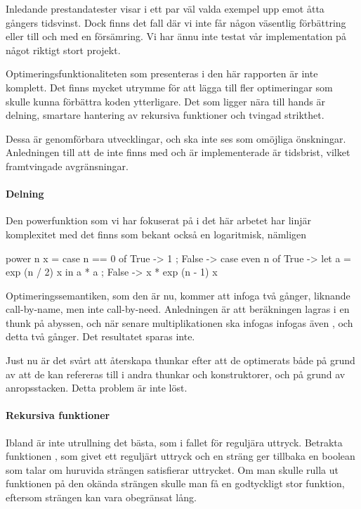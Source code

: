 \documentclass[Rapport]{subfiles}
\begin{document}
Inledande prestandatester visar i ett par väl valda exempel upp emot åtta gångers
tidsvinst. Dock finns det fall där vi inte får någon väsentlig förbättring eller
till och med en försämring. Vi har ännu inte testat vår implementation på något riktigt stort
projekt. 

Optimeringsfunktionaliteten som presenteras i den här rapporten är inte
komplett. Det finns mycket utrymme för att lägga till fler optimeringar
som skulle kunna förbättra koden ytterligare. Det som ligger nära till hands är
delning, smartare hantering av rekursiva funktioner och tvingad strikthet.

Dessa är genomförbara utvecklingar, och ska inte ses som omöjliga önskningar.
Anledningen till att de inte finns med och är implementerade är tidsbrist, vilket
framtvingade avgränsningar.

\paragraph{Delning}
Den powerfunktion som vi har fokuserat på i det här arbetet har linjär
komplexitet med det finns som bekant också en logaritmisk, nämligen

\begin{codeEx}
power n x = case n == 0 of
    { True  -> 1
    ; False -> case even n of
        { True  -> let a = exp (n / 2) x 
                   in  a * a
        ; False -> x * exp (n - 1) x
        }
    }
\end{codeEx}

Optimeringssemantiken, som den är nu, kommer att infoga  två gånger,
liknande call-by-name, men inte call-by-need. Anledningen är att beräkningen
 lagras i en thunk på abyssen, och när senare multiplikationen ska
infogas infogas även , och detta två gånger. Det resultatet sparas
inte.

    Just nu är det svårt att återskapa thunkar efter att de optimerats både på grund
av att de kan refereras till i andra thunkar och konstruktorer, och på grund
av anropsstacken. Detta problem är inte löst.

\paragraph{Rekursiva funktioner}
\label{sec:future-regexp}
Ibland är inte utrullning det bästa, som i fallet för reguljära uttryck.
Betrakta funktionen , som givet
ett reguljärt uttryck och en sträng ger tillbaka en boolean som talar om huruvida strängen
satisfierar uttrycket. Om man skulle rulla ut funktionen på den okända strängen
skulle man få en godtyckligt stor funktion, eftersom strängen kan vara 
obegränsat lång.
\end{document}
